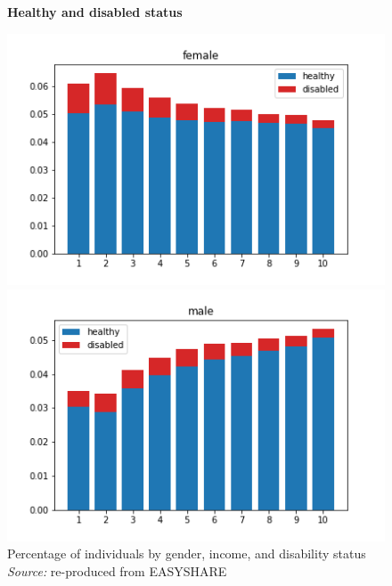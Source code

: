 \begin{figure}[H]
    \centering \textbf{Healthy and disabled status}\par\medskip
    \begin{minipage}{.5\textwidth}
        \centering
        \includegraphics[scale=.5]{images/disability_female.png}
    \end{minipage}%
   \begin{minipage}{.5\textwidth}
        \centering 
        \includegraphics[scale=.5]{images/disability_male.png}
    \end{minipage}
    \captionsetup{justification=centering}
    \caption{Percentage of individuals by gender, income, and disability status \\ \textit{Source:} re-produced from EASYSHARE}
    \label{fig:disability_True_all}
\end{figure}

